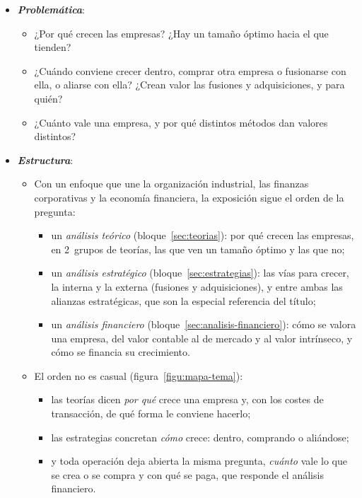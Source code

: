 \documentclass[11pt]{article}
\begin{document}
\begin{itemize}
\item \textbf{\emph{Problemática}}:
  \begin{itemize}
  \item ¿Por qué crecen las empresas? ¿Hay un tamaño óptimo hacia el que tienden?
  \item ¿Cuándo conviene crecer dentro, comprar otra empresa o fusionarse con ella, o aliarse con ella? ¿Crean valor las fusiones y adquisiciones, y para quién?
  \item ¿Cuánto vale una empresa, y por qué distintos métodos dan valores distintos?
  \end{itemize}

\item \textbf{\emph{Estructura}}:
  \begin{itemize}
  \item Con un enfoque que une la organización industrial, las finanzas corporativas y la economía financiera, la exposición sigue el orden de la pregunta:
  \begin{itemize}
  \item un \emph{análisis teórico} (bloque~\ref{sec:teorias}): por qué crecen las empresas, en 2~grupos de teorías, las que ven un tamaño óptimo y las que no;
  \item un \emph{análisis estratégico} (bloque~\ref{sec:estrategias}): las vías para crecer, la interna y la externa (fusiones y adquisiciones), y entre ambas las alianzas estratégicas, que son la especial referencia del título;
  \item un \emph{análisis financiero} (bloque~\ref{sec:analisis-financiero}): cómo se valora una empresa, del valor contable al de mercado y al valor intrínseco, y cómo se financia su crecimiento.
  \end{itemize}
  \item El orden no es casual (figura~\ref{figu:mapa-tema}):
  \begin{itemize}
  \item las teorías dicen \emph{por qué} crece una empresa y, con los costes de transacción, de qué forma le conviene hacerlo;
  \item las estrategias concretan \emph{cómo} crece: dentro, comprando o aliándose;
  \item y toda operación deja abierta la misma pregunta, \emph{cuánto} vale lo que se crea o se compra y con qué se paga, que responde el análisis financiero.
  \end{itemize}
  \end{itemize}
\end{itemize}
\end{document}
